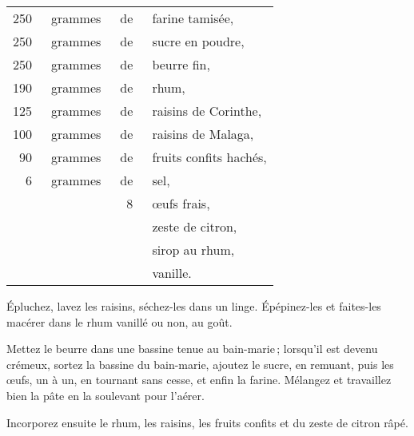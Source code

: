 \footnotesize
\begin{longtable}{rrrp{16em}}
    250 & grammes & de & farine tamisée,                                                                  \\
    250 & grammes & de & sucre en poudre,                                                                 \\
    250 & grammes & de & beurre fin,                                                                      \\
    190 & grammes & de & rhum,                                                                            \\
    125 & grammes & de & raisins de Corinthe,                                                             \\
    100 & grammes & de & raisins de Malaga,                                                               \\
     90 & grammes & de & fruits confits hachés,                                                           \\
      6 & grammes & de & sel,                                                                             \\
        &         &  8 & œufs frais,                                                                      \\
        &         &    & zeste de citron,                                                                 \\
        &         &    & sirop au rhum,                                                                   \\
        &         &    & vanille.                                                                         \\
\end{longtable}
\normalsize

Épluchez, lavez les raisins, séchez-les dans un linge. Épépinez-les et
faites-les macérer dans le rhum vanillé ou non, au goût.

Mettez le beurre dans une bassine tenue au bain-marie ; lorsqu'il est devenu
crémeux, sortez la bassine du bain-marie, ajoutez le sucre, en remuant, puis
les œufs, un à un, en tournant sans cesse, et enfin la farine. Mélangez et
travaillez bien la pâte en la soulevant pour l'aérer.

Incorporez ensuite le rhum, les raisins, les fruits confits et du zeste de
citron râpé.

